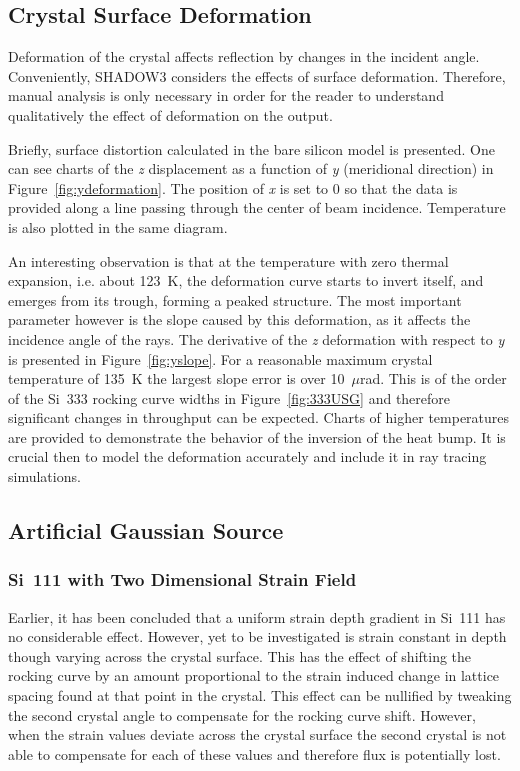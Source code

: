 \documentclass{iucr}
\begin{document}
\subsection{Crystal Surface Deformation}\label{deformation}

Deformation of the crystal affects reflection by changes in the incident angle. Conveniently, SHADOW3 considers the effects of surface deformation. Therefore, manual analysis is only necessary in order for the reader to understand qualitatively the effect of deformation on the output.

Briefly, surface distortion calculated in the bare silicon model is presented. One can see charts of the \textit{z} displacement as a function of \textit{y} (meridional direction) in Figure~\ref{fig:ydeformation}. The position of \textit{x} is set to 0 so that the data is provided along a line passing through the center of beam incidence. Temperature is also plotted in the same diagram.

An interesting observation is that at the temperature with zero thermal expansion, i.e. about 123~K, the deformation curve starts to invert itself, and emerges from its trough, forming a peaked structure. The most important parameter however is the slope caused by this deformation, as it affects the incidence angle of the rays. The derivative of the \textit{z} deformation with respect to \textit{y} is presented in Figure~\ref{fig:yslope}. For a reasonable maximum crystal temperature of 135~K the largest slope error is over 10~$\mu$rad. This is of the order of the Si~333 rocking curve widths in Figure~\ref{fig:333USG} and therefore significant changes in throughput can be expected. Charts of higher temperatures are provided to demonstrate the behavior of the inversion of the heat bump. It is crucial then to model the deformation accurately and include it in ray tracing simulations.

\subsection{Artificial Gaussian Source}\label{gaussian}

\subsubsection{Si~111 with Two Dimensional Strain Field}\label{111simulation}
Earlier, it has been concluded that a uniform strain depth gradient in Si~111 has no considerable effect. However, yet to be investigated is strain constant in depth though varying across the crystal surface. This has the effect of shifting the rocking curve by an amount proportional to the strain induced change in lattice spacing found at that point in the crystal. This effect can be nullified by tweaking the second crystal angle to compensate for the rocking curve shift. However, when the strain values deviate across the crystal surface the second crystal is not able to compensate for each of these values and therefore flux is potentially lost.
\end{document}
